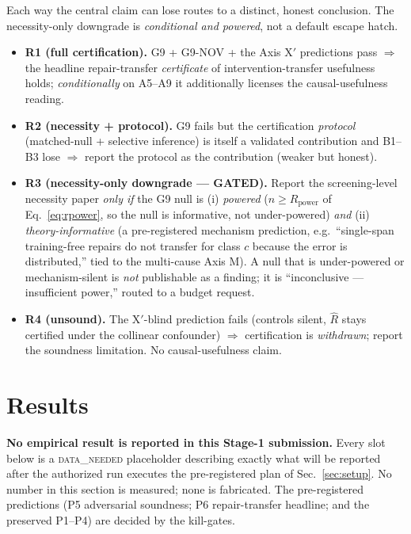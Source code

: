\documentclass[11pt]{article}
\theoremstyle{plain}
\theoremstyle{definition}
\newcommand{\Rhat}{\widehat{R}}
\begin{document}
Each way the central claim can lose routes to a distinct, honest conclusion. The
necessity-only downgrade is \emph{conditional and powered}, not a default escape
hatch.
\begin{itemize}[leftmargin=1.4em,itemsep=2pt]
  \item \textbf{R1 (full certification).} G9 + G9-NOV + the Axis X$'$ predictions
  pass $\Rightarrow$ the headline repair-transfer \emph{certificate} of
  intervention-transfer usefulness holds; \emph{conditionally} on A5--A9 it
  additionally licenses the causal-usefulness reading.
  \item \textbf{R2 (necessity + protocol).} G9 fails but the certification
  \emph{protocol} (matched-null + selective inference) is itself a validated
  contribution and B1--B3 lose $\Rightarrow$ report the protocol as the contribution
  (weaker but honest).
  \item \textbf{R3 (necessity-only downgrade --- GATED).} Report the screening-level
  necessity paper \emph{only if} the G9 null is (i) \emph{powered}
  ($n\ge R_{\mathrm{power}}$ of Eq.~\ref{eq:rpower}, so the null is informative, not
  under-powered) \emph{and} (ii) \emph{theory-informative} (a pre-registered
  mechanism prediction, e.g.\ ``single-span training-free repairs do not transfer for
  class $c$ because the error is distributed,'' tied to the multi-cause Axis M). A
  null that is under-powered or mechanism-silent is \emph{not} publishable as a
  finding; it is ``inconclusive --- insufficient power,'' routed to a budget request.
  \item \textbf{R4 (unsound).} The X$'$-blind prediction fails (controls silent,
  $\Rhat$ stays certified under the collinear confounder) $\Rightarrow$ certification
  is \emph{withdrawn}; report the soundness limitation. No causal-usefulness claim.
\end{itemize}

\section{Results}\label{sec:results}

\noindent\textbf{No empirical result is reported in this Stage-1 submission.} Every
slot below is a \textsc{data\_needed} placeholder describing exactly what will be
reported after the authorized run executes the pre-registered plan of
Sec.~\ref{sec:setup}. No number in this section is measured; none is fabricated. The
pre-registered predictions (P5 adversarial soundness; P6 repair-transfer headline;
and the preserved P1--P4) are decided by the kill-gates.
\end{document}
